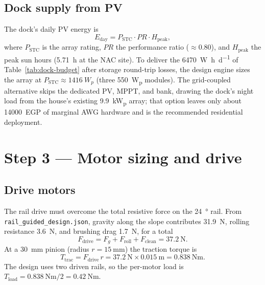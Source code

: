 \documentclass[11pt,a4paper]{article}
\begin{document}
\subsection{Dock supply from PV}

The dock's daily PV energy is
\begin{equation}
  E_{\text{day}} = P_{\text{STC}}\cdot PR \cdot H_{\text{peak}},
  \label{eq:eday}
\end{equation}
where $P_{\text{STC}}$ is the array rating, $PR$ the performance ratio
($\approx\num{0.80}$), and $H_{\text{peak}}$ the peak sun hours
(\SI{5.71}{\hour} at the NAC site). To deliver the \SI{6470}{\watt\hour\per\day}
of Table~\ref{tab:dock-budget} after storage round-trip losses, the design engine
sizes the array at $P_{\text{STC}}\approx\SI{1416}{W_{p}}$ (three
\SI{550}{W_{p}} modules). The grid-coupled alternative skips the dedicated PV,
MPPT, and bank, drawing the dock's night load from the house's existing
\SI{9.9}{\kilo\watt_{p}} array; that option leaves only about
\SI{14000}{EGP} of marginal AWG hardware and is the recommended residential
deployment.

\section{Step 3 --- Motor sizing and drive}
\label{sec:motors}

\subsection{Drive motors}

The rail drive must overcome the total resistive force on the \SI{24}{\degree}
rail. From \texttt{rail\_guided\_design.json}, gravity along the slope
contributes \SI{31.9}{\newton}, rolling resistance \SI{3.6}{\newton}, and
brushing drag \SI{1.7}{\newton}, for a total
\begin{equation}
  F_{\text{drive}} = F_{g} + F_{\text{roll}} + F_{\text{clean}}
  = \SI{37.2}{\newton}.
  \label{eq:fdrive}
\end{equation}
At a \SI{30}{\milli\meter} pinion (radius $r=\SI{15}{\milli\meter}$) the traction
torque is
\begin{equation}
  T_{\text{trac}} = F_{\text{drive}}\, r = \SI{37.2}{\newton}\times\SI{0.015}{\meter}
  = \SI{0.838}{\newton\meter}.
  \label{eq:ttrac}
\end{equation}
The design uses two driven rails, so the per-motor load is
$T_{\text{load}} = \SI{0.838}{\newton\meter}/2 = \SI{0.42}{\newton\meter}$.
\end{document}
